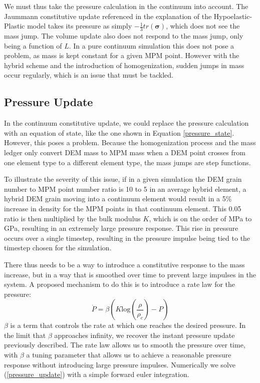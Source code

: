 We must thus take the pressure calculation in the continuum into account. The Jaummann constitutive update referenced in the explanation of the Hypoelastic-Plastic model takes its pressure as simply $-\frac{1}{3}tr(\bm{\sigma})$, which does not see the mass jump. The volume update also does not respond to the mass jump, only being a function of $L$. In a pure continuum simulation this does not pose a problem, as mass is kept constant for a given MPM point. However with the hybrid scheme and the introduction of homogenization, sudden jumps in mass occur regularly, which is an issue that must be tackled. 

\subsection{Pressure Update}
In the continuum constitutive update, we could replace the pressure calculation with an equation of state, like the one shown in Equation \ref{pressure_state}. However, this poses a problem. Because the homogenization process and the mass ledger only convert DEM mass to MPM mass when a DEM point crosses from one element type to a different element type, the mass jumps are step functions.

To illustrate the severity of this issue, if in a given simulation the DEM grain number to MPM point number ratio is 10 to 5 in an average hybrid element, a hybrid DEM grain moving into a continuum element would result in a 5\% increase in density for the MPM points in that continuum element. This 0.05 ratio is then multiplied by the bulk modulus $K$, which is on the order of MPa to GPa, resulting in an extremely large pressure response. This rise in pressure occurs over a single timestep, resulting in the pressure impulse being tied to the timestep chosen for the simulation.

There thus needs to be a way to introduce a constitutive response to the mass increase, but in a way that is smoothed over time to prevent large impulses in the system. A proposed mechanism to do this is to introduce a rate law for the pressure:
\begin{equation}
\dot P= \beta \left(K\text{log}\left(\frac{\rho}{\rho_c}\right)-P\right)
\label{pressure_update}
\end{equation}
$\beta$ is a term that controls the rate at which one reaches the desired pressure. In the limit that $\beta$ approaches infinity, we recover the instant pressure update previously described. The rate law allows us to smooth the pressure over time, with $\beta$ a tuning parameter that allows us to achieve a reasonable pressure response without introducing large pressure impulses. Numerically we solve (\ref{pressure_update}) with a simple forward euler integration.

